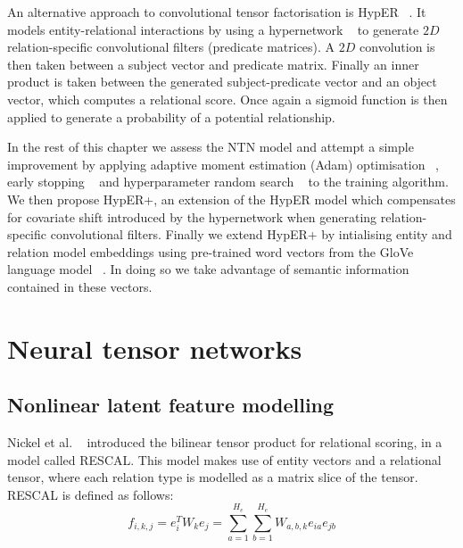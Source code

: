 \noindent An alternative approach to convolutional tensor factorisation is HypER \unskip~\citep{balazevic2019hypernetwork}. It models entity-relational interactions by using a hypernetwork \unskip~\citep{ha2016hypernetworks} to generate $ 2D $ relation-specific convolutional filters (predicate matrices). A $ 2D $ convolution is then taken between a subject vector and predicate matrix. Finally an inner product is taken between the generated subject-predicate vector and an object vector, which computes a relational score. Once again a sigmoid function is then applied to generate a probability of a potential relationship. \par

\noindent In the rest of this chapter we assess the NTN model and attempt a simple improvement by applying adaptive moment estimation (Adam) optimisation \unskip ~\citep{kingma2014adam}, early stopping \unskip ~\citep{prechelt1998early} and hyperparameter random search \unskip ~\citep{bergstra2012random} to the training algorithm. We then propose HypER+, an extension of the HypER model which compensates for covariate shift introduced by the hypernetwork when generating relation-specific convolutional filters. Finally we extend HypER+ by intialising entity and relation model embeddings using pre-trained word vectors from the GloVe language model \unskip ~\citep{pennington2014glove}. In doing so we take advantage of semantic information contained in these vectors. 



\section{Neural tensor networks}

\subsection{Nonlinear latent feature modelling}
Nickel et al. \unskip ~\citep{nickel2011three} introduced the bilinear tensor product for relational scoring, in a model called RESCAL. This model makes use of entity vectors and a relational tensor, where each relation type is modelled as a matrix slice of the tensor. RESCAL is defined as follows:
\begin{equation}
	f_{i, k, j} = e_i^TW_ke_j = \sum_{a=1}^{H_e}\sum_{b=1}^{H_e}W_{a,b,k}e_{ia}e_{jb}
\end{equation}

